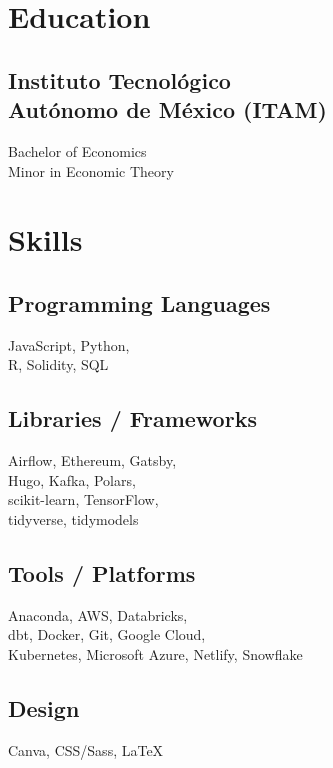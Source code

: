 \documentclass[]{resume}
\begin{document}
\begin{minipage}[t]{0.25\textwidth}


\section{Education}
\subsection{Instituto Tecnológico \\ Autónomo de México (ITAM)}
\sectionsep
Bachelor of Economics \\
Minor in Economic Theory \\
\sectionsep
\sectionsep


\section{Skills}
\subsection{Programming Languages}
\sectionsep
JavaScript,
Python, \\
R,
Solidity,
SQL
\sectionsep
\sectionsep
\subsection{Libraries / Frameworks}
\sectionsep
Airflow,
Ethereum,
Gatsby, \\
Hugo,
Kafka,
Polars, \\
scikit-learn,
TensorFlow, \\
tidyverse,
tidymodels
\sectionsep
\sectionsep
\subsection{Tools / Platforms}
Anaconda,
AWS,
Databricks, \\
dbt,
Docker,
Git,
Google Cloud, \\
Kubernetes,
Microsoft Azure,
Netlify,
Snowflake
\sectionsep
\sectionsep
\subsection{Design}
Canva,
CSS/Sass,
LaTeX
\sectionsep
\sectionsep



\end{minipage}
\end{document}
